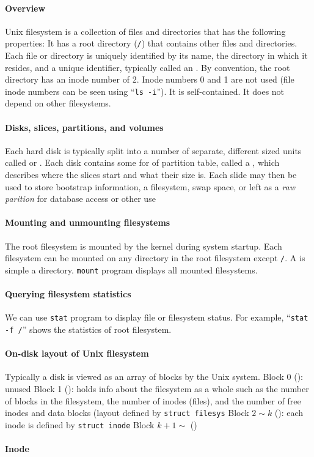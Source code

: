 \documentclass{memo}
\begin{document}
\small
{}

\paragraph{Overview} Unix filesystem is a collection of files and directories
that has the following properties:
  \bit
  \w It has a root directory (\verb+/+) that contains other files and
  directories. 
  \w Each file or directory is uniquely identified by its name, the directory
  in which it resides, and a unique identifier, typically called an
  . 
  \w By convention, the root directory has an inode number of 2. Inode numbers
  0 and 1 are not used (file inode numbers can be seen using
  ``\verb+ls -i+'').
  \w It is self-contained. It does not depend on other filesystems.
  \eit

\paragraph{Disks, slices, partitions, and volumes}
Each hard disk is typically split into a number of separate, different sized
units called  or . Each disk contains some for of
partition table, called a , which describes
where the slices start and what their size is.  
Each slide may then be used to store bootstrap information, a filesystem, swap
space, or left as a {\em raw parition\/} for database access or other use

\paragraph{Mounting and unmounting filesystems}
The root filesystem is mounted by the kernel during system startup. Each
filesystem can be mounted on any directory in the root filesystem except
\verb+/+. A  is simple a directory. \verb+mount+ program
displays all mounted filesystems.

\paragraph{Querying filesystem statistics}
We can use \verb+stat+ program to display file or filesystem status. For
example, ``\verb+stat -f /+'' shows the statistics of root filesystem. 

\paragraph{On-disk layout of Unix filesystem}
Typically a disk is viewed as an array of blocks by the Unix system. 
\bit
\w Block 0 (): unused 
\w Block 1 (): holds info about the filesystem as a
whole such as the number of blocks in the filesystem, the number of inodes
(files), and the number of free inodes and data blocks (layout defined by
\verb+struct filesys+ 
\w Block $2 \sim k$ (): each inode is defined by \verb+struct inode+
\w Block $k+1 \sim $ ()
\eit

\paragraph{Inode}
\end{document}
